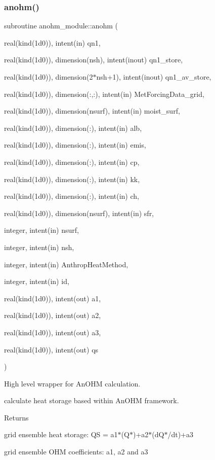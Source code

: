 \subsubsection{\texorpdfstring{anohm()}{anohm()}}
{\footnotesize\ttfamily subroutine anohm\+\_\+module\+::anohm (\begin{DoxyParamCaption}\item[{real(kind(1d0)), intent(in)}]{qn1,  }\item[{real(kind(1d0)), dimension(nsh), intent(inout)}]{qn1\+\_\+store,  }\item[{real(kind(1d0)), dimension(2$\ast$nsh+1), intent(inout)}]{qn1\+\_\+av\+\_\+store,  }\item[{real(kind(1d0)), dimension(\+:,\+:), intent(in)}]{Met\+Forcing\+Data\+\_\+grid,  }\item[{real(kind(1d0)), dimension(nsurf), intent(in)}]{moist\+\_\+surf,  }\item[{real(kind(1d0)), dimension(\+:), intent(in)}]{alb,  }\item[{real(kind(1d0)), dimension(\+:), intent(in)}]{emis,  }\item[{real(kind(1d0)), dimension(\+:), intent(in)}]{cp,  }\item[{real(kind(1d0)), dimension(\+:), intent(in)}]{kk,  }\item[{real(kind(1d0)), dimension(\+:), intent(in)}]{ch,  }\item[{real(kind(1d0)), dimension(nsurf), intent(in)}]{sfr,  }\item[{integer, intent(in)}]{nsurf,  }\item[{integer, intent(in)}]{nsh,  }\item[{integer, intent(in)}]{Anthrop\+Heat\+Method,  }\item[{integer, intent(in)}]{id,  }\item[{real(kind(1d0)), intent(out)}]{a1,  }\item[{real(kind(1d0)), intent(out)}]{a2,  }\item[{real(kind(1d0)), intent(out)}]{a3,  }\item[{real(kind(1d0)), intent(out)}]{qs }\end{DoxyParamCaption})}



High level wrapper for An\+O\+HM calculation. 

calculate heat storage based within An\+O\+HM framework. \begin{DoxyReturn}{Returns}

\begin{DoxyEnumerate}
\item grid ensemble heat storage\+: QS = a1$\ast$(Q$\ast$)+a2$\ast$(d\+Q$\ast$/dt)+a3
\item grid ensemble O\+HM coefficients\+: a1, a2 and a3
\end{DoxyEnumerate}
\end{DoxyReturn}

